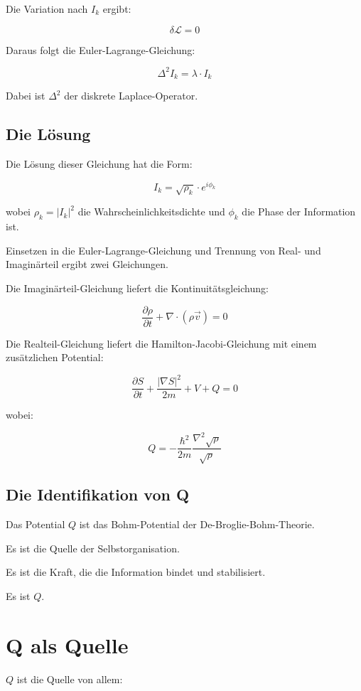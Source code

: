 Die Variation nach \( I_k \) ergibt:

\[
\delta \mathcal{L} = 0
\]

Daraus folgt die Euler-Lagrange-Gleichung:

\[
\Delta^2 I_k = \lambda \cdot I_k
\]

Dabei ist \( \Delta^2 \) der diskrete Laplace-Operator.

\subsection{Die Lösung}

Die Lösung dieser Gleichung hat die Form:

\[
I_k = \sqrt{\rho_k} \cdot e^{i \phi_k}
\]

wobei \( \rho_k = |I_k|^2 \) die Wahrscheinlichkeitsdichte und \( \phi_k \) die Phase der Information ist.

Einsetzen in die Euler-Lagrange-Gleichung und Trennung von Real- und Imaginärteil ergibt zwei Gleichungen.

Die Imaginärteil-Gleichung liefert die Kontinuitätsgleichung:

\[
\frac{\partial \rho}{\partial t} + \nabla \cdot (\rho \vec{v}) = 0
\]

Die Realteil-Gleichung liefert die Hamilton-Jacobi-Gleichung mit einem zusätzlichen Potential:

\[
\frac{\partial S}{\partial t} + \frac{|\nabla S|^2}{2m} + V + Q = 0
\]

wobei:

\[
Q = -\frac{\hbar^2}{2m} \frac{\nabla^2 \sqrt{\rho}}{\sqrt{\rho}}
\]

\subsection{Die Identifikation von Q}

Das Potential \( Q \) ist das Bohm-Potential der De-Broglie-Bohm-Theorie.

Es ist die Quelle der Selbstorganisation.

Es ist die Kraft, die die Information bindet und stabilisiert.

Es ist \( Q \).

\section{Q als Quelle}

\( Q \) ist die Quelle von allem:

